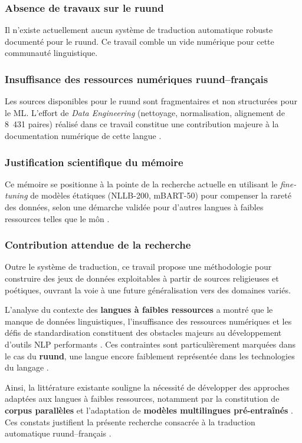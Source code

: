 \subsubsection{Absence de travaux sur le ruund}

Il n'existe actuellement aucun système de traduction automatique robuste documenté pour le ruund. Ce travail comble un vide numérique pour cette communauté linguistique.

\subsubsection{Insuffisance des ressources numériques ruund--français}

Les sources disponibles pour le ruund sont fragmentaires et non structurées pour le \ac{ML}. L'effort de \textit{Data Engineering} (nettoyage, normalisation, alignement de 8~431 paires) réalisé dans ce travail constitue une contribution majeure à la documentation numérique de cette langue \cite{Mununga2026ruunddataset}.

\subsubsection{Justification scientifique du mémoire}

Ce mémoire se positionne à la pointe de la recherche actuelle en utilisant le \textit{fine-tuning} de modèles étatiques (NLLB-200, mBART-50) pour compenser la rareté des données, selon une démarche validée pour d'autres langues à faibles ressources telles que le môn \cite{tun2025exploring}.

\subsubsection{Contribution attendue de la recherche}

Outre le système de traduction, ce travail propose une méthodologie pour construire des jeux de données exploitables à partir de sources religieuses et poétiques, ouvrant la voie à une future généralisation vers des domaines variés.

L'analyse du contexte des \textbf{langues à faibles ressources} a montré que le manque de données linguistiques, l'insuffisance des ressources numériques et les défis de standardisation constituent des obstacles majeurs au développement d'outils \ac{NLP} performants \cite{ranathunga2023neural, agyei2024low}. Ces contraintes sont particulièrement marquées dans le cas du \textbf{ruund}, une langue encore faiblement représentée dans les technologies du langage \cite{haulai2023construction, jindal2017building}.

Ainsi, la littérature existante souligne la nécessité de développer des approches adaptées aux langues à faibles ressources, notamment par la constitution de \textbf{corpus parallèles} et l'adaptation de \textbf{modèles multilingues pré-entraînés} \cite{ranathunga2023neural, haulai2023construction}. Ces constats justifient la présente recherche consacrée à la traduction automatique ruund--français \cite{rakhimov2024enhancing, nguyen2017transfer}.